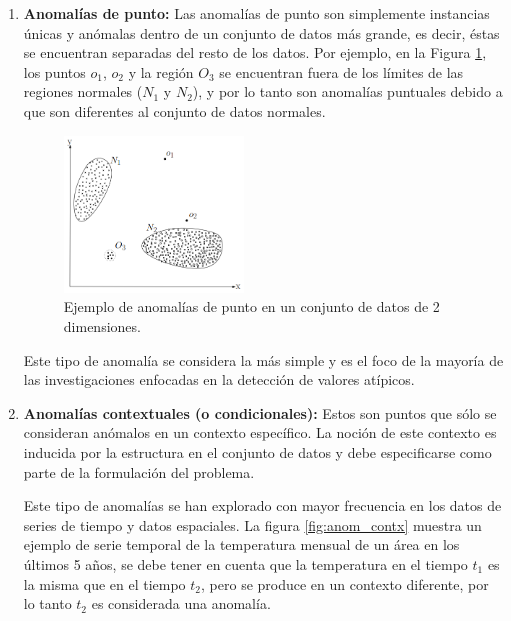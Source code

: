 \begin{enumerate}[1.]

\item \textbf{Anomal\'{i}as de punto: }Las anomalías de punto son simplemente instancias únicas y anómalas dentro de un conjunto de datos más grande, es decir, \'{e}stas se encuentran separadas del resto de los datos. Por ejemplo, en la Figura \ref{fig:anom_2D}, los puntos $o_1$, $o_2$ y la regi\'{o}n $O_3$ se encuentran fuera de los l\'{i}mites de las regiones normales ($N_1$ y $N_2$), y por lo tanto son anomal\'{i}as puntuales debido a que son diferentes al conjunto de datos normales.

\begin{figure}[h!]
  \begin{center}	\includegraphics[width=0.45\textwidth]{imagenes/anom_2D}
  \caption{Ejemplo de anomal\'{i}as de punto en un conjunto de datos de 2 dimensiones.}
  \label{fig:anom_2D}
  \end{center}
\end{figure}

\vspace{5mm} %

Este tipo de anomal\'{i}a se considera la m\'{a}s simple y es el foco de la mayor\'{i}a de las investigaciones enfocadas en la detecci\'{o}n de valores at\'{i}picos.

\item \textbf{Anomal\'{i}as contextuales (o condicionales): }Estos son puntos que s\'{o}lo se consideran anómalos en un contexto espec\'{i}fico. La noci\'{o}n de este contexto es inducida por la estructura en el conjunto de datos y debe especificarse como parte de la formulaci\'{o}n del problema.

\vspace{5mm} %

Este tipo de anomal\'{i}as se han explorado con mayor frecuencia en los datos de series de tiempo y datos espaciales. La figura \ref{fig:anom_contx} muestra un ejemplo de serie temporal de la temperatura mensual de un \'{a}rea en los \'{u}ltimos 5 a\~{n}os, se debe tener en cuenta que la temperatura en el tiempo $t_1$ es la misma que en el tiempo $t_2$, pero se produce en un contexto diferente, por lo tanto $t_2$ es considerada una anomal\'{i}a.


\end{enumerate}
